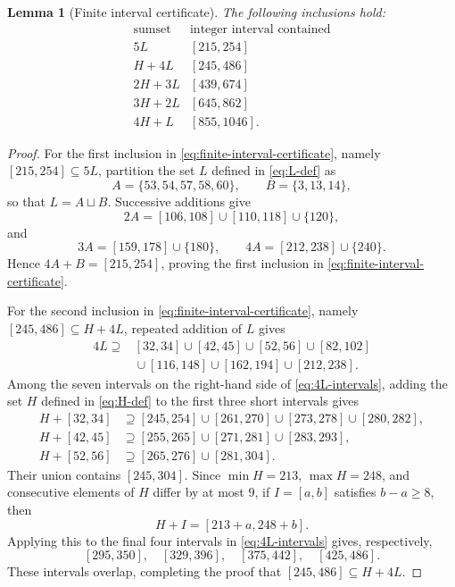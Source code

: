 \documentclass[12pt]{article}
\theoremstyle{plain}
\newtheorem{lemma}[theorem]{Lemma}
\theoremstyle{definition}
\theoremstyle{plain}
\begin{document}
\begin{lemma}[Finite interval certificate]\label{lem:finitefive}
The following inclusions hold:
\begin{equation}\label{eq:finite-interval-certificate}
\begin{array}{c|c}
\text{sumset}&\text{integer interval contained}\\ \hline
5L &[215,254]\\
H+4L &[245,486]\\
2H+3L &[439,674]\\
3H+2L &[645,862]\\
4H+L &[855,1046].
\end{array}
\end{equation}
\end{lemma}

\begin{proof}
For the first inclusion in
\eqref{eq:finite-interval-certificate}, namely
$[215,254]\subseteq5L$, partition the set $L$ defined in
\eqref{eq:L-def} as
\[
 A=\{53,54,57,58,60\},\qquad B=\{3,13,14\},
\]
so that $L=A\sqcup B$.  Successive additions give
\[
 2A=[106,108]\cup[110,118]\cup\{120\},
\]
and
\[
 3A=[159,178]\cup\{180\},\qquad
 4A=[212,238]\cup\{240\}.
\]
Hence $4A+B=[215,254]$, proving the first inclusion in
\eqref{eq:finite-interval-certificate}.

For the second inclusion in
\eqref{eq:finite-interval-certificate}, namely
$[245,486]\subseteq H+4L$, repeated addition of $L$ gives
\begin{equation}\label{eq:4L-intervals}
\begin{split}
4L\supseteq{}&[32,34]\cup[42,45]\cup[52,56]\cup[82,102]\\
 &{}\cup[116,148]\cup[162,194]\cup[212,238].
\end{split}
\end{equation}
Among the seven intervals on the right-hand side of
\eqref{eq:4L-intervals}, adding the set $H$ defined in
\eqref{eq:H-def} to the first three short intervals gives
\[
\begin{aligned}
H+[32,34]&\supseteq[245,254]\cup[261,270]
 \cup[273,278]\cup[280,282],\\
H+[42,45]&\supseteq[255,265]\cup[271,281]\cup[283,293],\\
H+[52,56]&\supseteq[265,276]\cup[281,304].
\end{aligned}
\]
Their union contains $[245,304]$.  Since $\min H=213$,
$\max H=248$, and consecutive elements of $H$ differ by at most $9$,
if $I=[a,b]$ satisfies $b-a\geq8$, then
\[
 H+I=[213+a,248+b].
\]
Applying this to the final four intervals in
\eqref{eq:4L-intervals} gives, respectively,
\[
 [295,350],\quad[329,396],\quad[375,442],\quad[425,486].
\]
These intervals overlap, completing the proof that
$[245,486]\subseteq H+4L$.


\end{proof}
\end{document}
